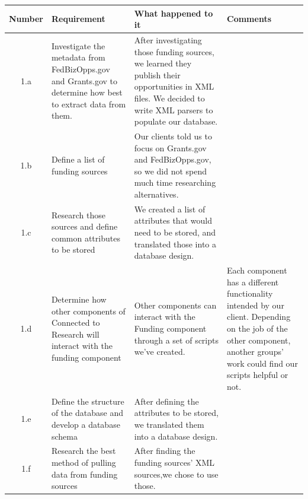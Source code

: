 \documentclass[onecolumn]{IEEEtran}
\begin{document}
\begin{tabularx}{\textwidth}{|c|X|X|X|}
    \textbf{Number} & \textbf{Requirement} & \textbf{What happened to it}  & \textbf{Comments}\\
    \hline
    1.a & Investigate the metadata from FedBizOpps.gov and Grants.gov to determine how best to extract data from them. & After investigating those funding sources, we learned they publish their opportunities in XML files. We decided to write XML parsers to populate our database. \\
    \hline
    1.b & Define a list of funding sources & Our clients told us to focus on Grants.gov and FedBizOpps.gov, so we did not spend much time researching alternatives. \\
    \hline
    1.c & Research those sources and define common attributes to be stored & We created a list of attributes that would need to be stored, and translated those into a database design. \\
    \hline
    1.d & Determine how other components of Connected to Research will interact with the funding component & Other components can interact with the Funding component through a set of scripts we've created. & Each component has a different functionality intended by our client. Depending on the job of the other component, another groups' work could find our scripts helpful or not. \\
    \hline
    1.e & Define the structure of the database and develop a database schema & After defining the attributes to be stored, we translated them into a database design. \\
    \hline
    1.f & Research the best method of pulling data from funding sources & After finding the funding sources' XML sources,we chose to use those. \\
    \hline
\end{tabularx}
\end{document}
